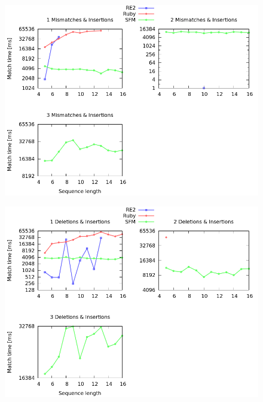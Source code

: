 \documentclass[12pt]{article}
\theoremstyle{definition}
\begin{document}
\begin{figure}[H]
	\begin{center}
		\includegraphics[scale=0.55]{graphs/seq_length_mismatches_insertions.png}	
	\end{center}
	\caption{}
	\label{graph:cases:combinations}
\end{figure}

\begin{figure}[H]
	\begin{center}
		\includegraphics[scale=0.55]{graphs/seq_length_deletions_insertions.png}	
	\end{center}
	\caption{}
	\label{graph:cases:combinations}
\end{figure}
\end{document}
